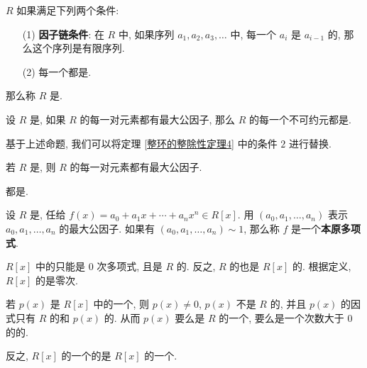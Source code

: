 \begin{theorem}\label{整环的整除性定理4}
	 $R$ 如果满足下列两个条件:
	\begin{itemize}[leftmargin=1.5cm]
		\item[(1)] \textbf{因子链条件}\label{因子链条件}: 在 $R$ 中, 如果序列 $a_1,a_2,a_3,\ldots$ 中, 每一个 $a_i$ 是 $a_{i-1}$ 的, 那么这个序列是有限序列.
		
		\item[(2)] 每一个都是. 
	\end{itemize}
	那么称 $R$ 是.
\end{theorem}

\begin{proposition}
	设 $R$ 是, 如果 $R$ 的每一对元素都有最大公因子, 那么 $R$ 的每一个不可约元都是.
\end{proposition}

基于上述命题, 我们可以将定理 \ref{整环的整除性定理4} 中的条件 $2$ 进行替换.

\begin{theorem}
	若 $R$ 是, 则 $R$ 的每一对元素都有最大公因子.
\end{theorem}

\begin{theorem}
	都是.
\end{theorem}

\begin{definition}\label{本原多项式}
	设 $R$ 是, 任给 $f(x)=a_0+a_1x+\cdots+a_nx^n\in R[x]$. 用 $(a_0,a_1,\ldots,a_n)$ 表示 $a_0,a_1,\ldots,a_n$ 的最大公因子. 如果有 $(a_0,a_1,\ldots,a_n)\sim 1$, 那么称 $f$ 是一个\textbf{本原多项式}.
\end{definition}


\begin{proposition}
	$R[x]$ 中的只能是 $0$ 次多项式, 且是 $R$ 的. 反之, $R$  的也是 $R[x]$ 的. 根据定义, $R[x]$ 的是零次.
\end{proposition}

\begin{proposition}
	若 $p(x)$ 是 $R[x]$ 中的一个, 则 $p(x)\neq 0$, $p(x)$ 不是 $R$ 的, 并且 $p(x)$ 的因式只有 $R$ 的和 $p(x)$ 的. 从而 $p(x)$ 要么是 $R$ 的一个, 要么是一个次数大于 $0$ 的的.
	
	反之, $R[x]$ 的一个的是 $R[x]$ 的一个.
\end{proposition}

